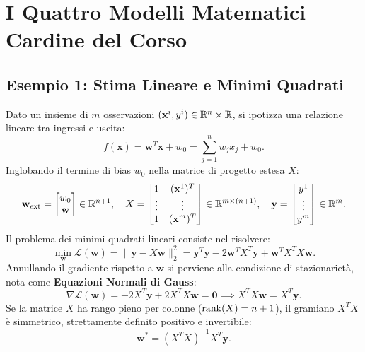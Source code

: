 \FloatBarrier
\section{I Quattro Modelli Matematici Cardine del Corso}

\subsection{Esempio 1: Stima Lineare e Minimi Quadrati}
Dato un insieme di $m$ osservazioni $(\mathbf{x}^i, y^i) \in \mathbb{R}^n \times \mathbb{R}$, si ipotizza una relazione lineare tra ingressi e uscita:
\begin{equation}
    f(\mathbf{x}) = \mathbf{w}^T \mathbf{x} + w_0 = \sum_{j=1}^n w_j x_j + w_0.
\end{equation}
Inglobando il termine di bias $w_0$ nella matrice di progetto estesa $X$:
\begin{equation}
    \mathbf{w}_{\text{ext}} = \begin{bmatrix} w_0 \\ \mathbf{w} \end{bmatrix} \in \mathbb{R}^{n+1}, \quad
    X = \begin{bmatrix} 1 & (\mathbf{x}^1)^T \\ \vdots & \vdots \\ 1 & (\mathbf{x}^m)^T \end{bmatrix} \in \mathbb{R}^{m \times (n+1)}, \quad
    \mathbf{y} = \begin{bmatrix} y^1 \\ \vdots \\ y^m \end{bmatrix} \in \mathbb{R}^m.
\end{equation}
Il problema dei minimi quadrati lineari consiste nel risolvere:
\begin{equation}
    \min_{\mathbf{w}} \mathcal{L}(\mathbf{w}) = \|\mathbf{y} - X\mathbf{w}\|_2^2 = \mathbf{y}^T \mathbf{y} - 2\mathbf{w}^T X^T \mathbf{y} + \mathbf{w}^T X^T X \mathbf{w}.
\end{equation}
Annullando il gradiente rispetto a $\mathbf{w}$ si perviene alla condizione di stazionariet\`a, nota come \textbf{Equazioni Normali di Gauss}:
\begin{equation}
    \nabla \mathcal{L}(\mathbf{w}) = -2 X^T \mathbf{y} + 2 X^T X \mathbf{w} = \mathbf{0} \implies X^T X \mathbf{w} = X^T \mathbf{y}.
\end{equation}
Se la matrice $X$ ha rango pieno per colonne ($\operatorname{rank}(X) = n+1$), il gramiano $X^T X$ \`e simmetrico, strettamente definito positivo e invertibile:
\begin{equation}
    \mathbf{w}^* = (X^T X)^{-1} X^T \mathbf{y}.
\end{equation}

